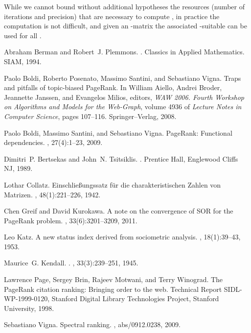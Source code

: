 \documentclass{article}
\newcommand{\1}{\mathbf 1}
\begin{document}
While we cannot bound without additional
hypotheses the resources (number of iterations and precision) that are necessary
to compute , in practice the computation is not difficult, and given an
-matrix  the associated -suitable  can be used for all
.  

\begin{thebibliography}{PBMW98}

Abraham Berman and Robert~J. Plemmons.
.
\newblock Classics in Applied Mathematics. SIAM, 1994.

Paolo Boldi, Roberto Posenato, Massimo Santini, and Sebastiano Vigna.
\newblock Traps and pitfalls of topic-biased {P}age{R}ank.
\newblock In William Aiello, Andrei Broder, Jeannette Janssen, and Evangelos
  Milios, editors, {\em WAW 2006. Fourth Workshop on Algorithms and Models for
  the Web-Graph}, volume 4936 of {\em Lecture Notes in Computer Science}, pages
  107--116. Springer--Verlag, 2008.

Paolo Boldi, Massimo Santini, and Sebastiano Vigna.
\newblock Page{R}ank: {F}unctional dependencies.
, 27(4):1--23, 2009.

Dimitri~P. Bertsekas and John~N. Tsitsiklis.
.
\newblock Prentice Hall, Englewood Cliffs NJ, 1989.

Lothar Collatz.
\newblock Einschlie{\ss}ungssatz f{\"u}r die charakteristischen {Z}ahlen von
  {M}atrizen.
, 48(1):221--226, 1942.

Chen Greif and David Kurokawa.
\newblock A note on the convergence of {SOR} for the {P}age{R}ank problem.
, 33(6):3201--3209, 2011.

Leo Katz.
\newblock A new status index derived from sociometric analysis.
, 18(1):39--43, 1953.

Maurice~G. Kendall.
.
, 33(3):239--251, 1945.

Lawrence Page, Sergey Brin, Rajeev Motwani, and Terry Winograd.
\newblock The {P}age{R}ank citation ranking: Bringing order to the web.
\newblock Technical Report SIDL-WP-1999-0120, Stanford Digital Library
  Technologies Project, Stanford University, 1998.

Sebastiano Vigna.
\newblock Spectral ranking.
, abs/0912.0238, 2009.

\end{thebibliography}
\end{document}
